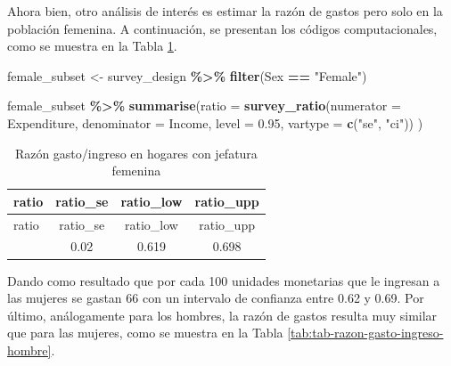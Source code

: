 \documentclass[
  spanish,
  12pt,
]{book}
\newenvironment{Shaded}{\begin{snugshade}}{\end{snugshade}}
\newcommand{\AttributeTok}[1]{\textcolor[rgb]{0.13,0.29,0.53}{#1}}
\newcommand{\FloatTok}[1]{\textcolor[rgb]{0.00,0.00,0.81}{#1}}
\newcommand{\FunctionTok}[1]{\textcolor[rgb]{0.13,0.29,0.53}{\textbf{#1}}}
\newcommand{\NormalTok}[1]{#1}
\newcommand{\OtherTok}[1]{\textcolor[rgb]{0.56,0.35,0.01}{#1}}
\newcommand{\SpecialCharTok}[1]{\textcolor[rgb]{0.81,0.36,0.00}{\textbf{#1}}}
\newcommand{\StringTok}[1]{\textcolor[rgb]{0.31,0.60,0.02}{#1}}
\begin{document}
Ahora bien, otro análisis de interés es estimar la razón de gastos pero solo en la población femenina. A continuación, se presentan los códigos computacionales, como se muestra en la Tabla \ref{tab:tab-razon-gasto-ingreso-mujer}.

\begin{Shaded}
\begin{Highlighting}[]
\NormalTok{female\_subset }\OtherTok{\textless{}{-}}\NormalTok{ survey\_design }\SpecialCharTok{\%\textgreater{}\%}
  \FunctionTok{filter}\NormalTok{(Sex }\SpecialCharTok{==} \StringTok{"Female"}\NormalTok{)}

\NormalTok{female\_subset }\SpecialCharTok{\%\textgreater{}\%}
  \FunctionTok{summarise}\NormalTok{(}\AttributeTok{ratio =} \FunctionTok{survey\_ratio}\NormalTok{(}\AttributeTok{numerator =}\NormalTok{ Expenditure,}
                                 \AttributeTok{denominator =}\NormalTok{ Income,}
                                 \AttributeTok{level =} \FloatTok{0.95}\NormalTok{,}
                                 \AttributeTok{vartype =} \FunctionTok{c}\NormalTok{(}\StringTok{"se"}\NormalTok{, }\StringTok{"ci"}\NormalTok{))}
\NormalTok{            )}
\end{Highlighting}
\end{Shaded}

\begin{longtable}[]{@{}lccc@{}}
\caption{\label{tab:tab-razon-gasto-ingreso-mujer}Razón gasto/ingreso en hogares con jefatura femenina}\tabularnewline
\toprule\noalign{}
ratio & ratio\_se & ratio\_low & ratio\_upp \\
\midrule\noalign{}
\endfirsthead
\toprule\noalign{}
ratio & ratio\_se & ratio\_low & ratio\_upp \\
\midrule\noalign{}
\endhead
\bottomrule\noalign{}
\endlastfoot
0.658 & 0.02 & 0.619 & 0.698 \\
\end{longtable}

Dando como resultado que por cada 100 unidades monetarias que le ingresan a las mujeres se gastan 66 con un intervalo de confianza entre 0.62 y 0.69. Por último, análogamente para los hombres, la razón de gastos resulta muy similar que para las mujeres, como se muestra en la Tabla \ref{tab:tab-razon-gasto-ingreso-hombre}.
\end{document}
